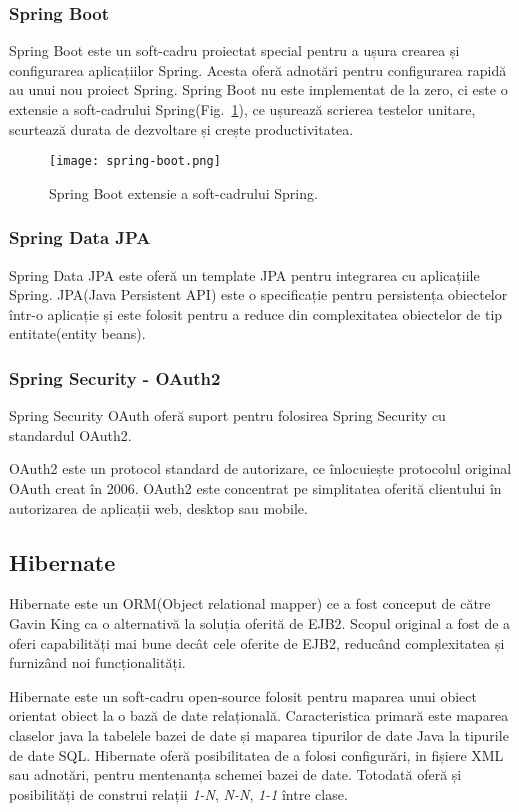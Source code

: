     \subsubsection{Spring Boot}
Spring Boot este un soft-cadru proiectat special pentru a ușura crearea și configurarea aplicațiilor Spring. Acesta oferă adnotări pentru
configurarea rapidă au unui nou proiect Spring. Spring Boot nu este implementat de la zero, ci este o extensie a soft-cadrului Spring(Fig.~\ref{fig:spring-boot}), ce 
ușurează scrierea testelor unitare, scurtează durata de dezvoltare și crește productivitatea\cite{SpringBoot}.
\begin{figure}[h]
\texttt{[image: spring-boot.png]}
\centering
\caption{Spring Boot extensie a soft-cadrului Spring.}
\label{fig:spring-boot}
\end{figure} 

    \subsubsection{Spring Data JPA}
Spring Data JPA este oferă un template JPA pentru integrarea cu aplicațiile Spring. JPA(Java Persistent API) este o specificație pentru 
persistența obiectelor într-o aplicație și este folosit pentru a reduce din complexitatea obiectelor de tip entitate(entity beans).

    \subsubsection{Spring Security - OAuth2}
Spring Security OAuth oferă suport pentru folosirea Spring Security cu standardul OAuth2.

    OAuth2 este un protocol standard de autorizare, ce înlocuiește protocolul original OAuth creat în 2006. OAuth2 este concentrat pe 
simplitatea oferită clientului în autorizarea de aplicații web, desktop sau mobile\cite{OAuth2}.
    \subsection{Hibernate}
Hibernate este un ORM(Object relational mapper) ce a fost conceput de către Gavin King ca o alternativă la soluția oferită de EJB2. Scopul original a fost de 
a oferi capabilități mai bune decât cele oferite de EJB2, reducând complexitatea și furnizând noi funcționalități.

Hibernate este un soft-cadru open-source folosit pentru maparea unui obiect orientat
obiect la o bază de date relațională. Caracteristica primară este maparea claselor java la tabelele bazei de date și maparea tipurilor de date Java
la tipurile de date SQL. Hibernate oferă posibilitatea de a folosi configurări, in fișiere XML sau adnotări, pentru mentenanța schemei bazei de date.
Totodată oferă și posibilități de construi relații \textit{1-N}, \textit{N-N}, \textit{1-1} între clase.
    
